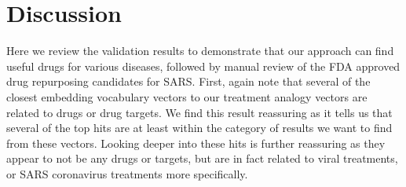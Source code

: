 \documentclass{article}
\begin{document}
\section{Discussion}

Here we review the validation results to demonstrate that our approach can find useful drugs for various diseases, followed by manual review of the FDA approved drug repurposing candidates for SARS.
First, again note that several of the closest embedding vocabulary vectors to our treatment analogy vectors are related to drugs or drug targets.
We find this result reassuring as it tells us that several of the top hits are at least within the category of results we want to find from these vectors.
Looking deeper into these hits is further reassuring as they appear to not be any drugs or targets, but are in fact related to viral treatments, or SARS coronavirus treatments more specifically.
\end{document}

